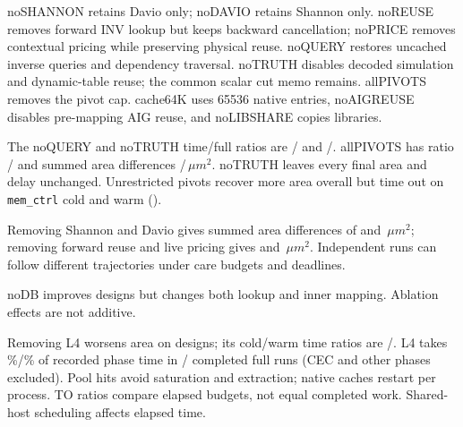 noSHANNON retains Davio only; noDAVIO retains Shannon only. noREUSE removes forward INV lookup but keeps backward cancellation; noPRICE removes contextual pricing while preserving physical reuse. noQUERY restores uncached inverse queries and dependency traversal. noTRUTH disables decoded simulation and dynamic-table reuse; the common scalar cut memo remains. allPIVOTS removes the pivot cap. cache64K uses 65536 native entries, noAIGREUSE disables pre-mapping AIG reuse, and noLIBSHARE copies libraries.

The noQUERY and noTRUTH time/full ratios are \QueryColdRatio{}/\QueryWarmRatio{} and \TruthColdRatio{}/\TruthWarmRatio{}. allPIVOTS has ratio \PivotColdRatio{}/\PivotWarmRatio{} and summed area differences \PivotAreaCold{}/\PivotAreaWarm{}\,$\mu m^2$. noTRUTH leaves every final area and delay unchanged. Unrestricted pivots recover more area overall but time out on \texttt{mem\_ctrl} cold and warm ().

Removing Shannon and Davio gives summed area differences of \DeltaShannon{} and \DeltaDavio\,$\mu m^2$; removing forward reuse and live pricing gives \DeltaReuse{} and \DeltaPrice\,$\mu m^2$. \UsbAblationExample{} Independent runs can follow different trajectories under care budgets and deadlines. \DeadlineExample{}

noDB improves \DBBetterCount{} designs but changes both lookup and inner mapping. Ablation effects are not additive.

Removing L4 worsens area on \EggWorseCount{} designs; its cold/warm time ratios are \ColdNoEggRatio{}/\WarmNoEggRatio{}. L4 takes \TimeEggShare\%/\WarmTimeEggShare\% of recorded phase time in \ColdPhaseRuns{}/\WarmPhaseRuns{} completed full runs (CEC and other phases excluded). Pool hits avoid saturation and extraction; native caches restart per process. TO ratios compare elapsed budgets, not equal completed work. \CacheDeadlineExample{} Shared-host scheduling affects elapsed time.


